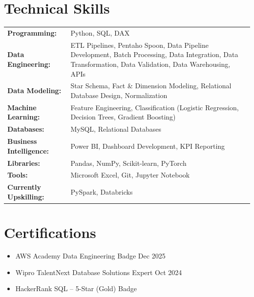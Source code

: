 \documentclass[a4paper,12pt]{article}
\begin{document}
\section{Technical Skills}
\begin{tabularx}{\linewidth}{@{}l X@{}}
\textbf{Programming:} & \normalsize{Python, SQL, DAX}\\
\textbf{Data Engineering:} & \normalsize{ETL Pipelines, Pentaho Spoon, Data Pipeline Development, Batch Processing, Data Integration, Data Transformation, Data Validation, Data Warehousing, APIs}\\
\textbf{Data Modeling:} & \normalsize{Star Schema, Fact \& Dimension Modeling, Relational Database Design, Normalization}\\
\textbf{Machine Learning:} & \normalsize{Feature Engineering, Classification (Logistic Regression, Decision Trees, Gradient Boosting)}\\
\textbf{Databases:} & \normalsize{MySQL, Relational Databases}\\
\textbf{Business Intelligence:} & \normalsize{Power BI, Dashboard Development, KPI Reporting}\\
\textbf{Libraries:} & \normalsize{Pandas, NumPy, Scikit-learn, PyTorch}\\
\textbf{Tools:} & \normalsize{Microsoft Excel, Git, Jupyter Notebook}\\
\textbf{Currently Upskilling:} & \normalsize{PySpark, Databricks}\\

\end{tabularx}


\section{Certifications}

\begin{itemize}[leftmargin=1em, itemsep=10pt, label=--]
    \item AWS Academy Data Engineering Badge \hfill Dec 2025
    \item Wipro TalentNext Database Solutions Expert \hfill Oct 2024
    \item HackerRank SQL -- 5-Star (Gold) Badge
\end{itemize}


\vfill
\center
\end{document}
